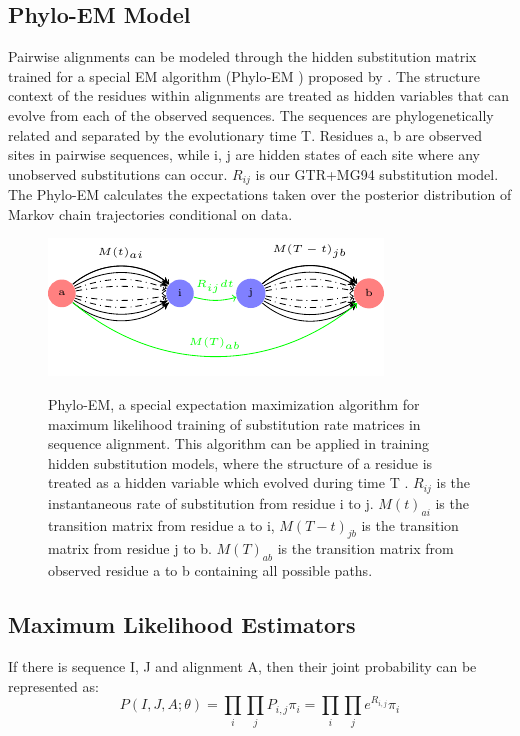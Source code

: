 \subsection{Phylo-EM Model}
Pairwise alignments can be modeled through the hidden substitution matrix trained for a special EM algorithm (Phylo-EM ) proposed by \cite{holmes2002expectation}. The structure context of the residues within alignments are treated as hidden variables that can evolve from each of the observed sequences. The sequences are phylogenetically related and separated by the evolutionary time T. Residues a, b are observed sites in pairwise sequences, while i, j are hidden states of each site where any unobserved substitutions can occur. $R_{ij}$ is our GTR+MG94 substitution model. The Phylo-EM calculates the expectations taken over the posterior distribution of Markov chain trajectories conditional on data. 
\begin{figure}[H]
     \centering
     \begin{minipage}[t]{1\textwidth}
     \includegraphics[width=\linewidth]{Fig1.pdf}
     {Phylo-EM, a special expectation maximization algorithm for maximum likelihood training of substitution rate matrices in sequence alignment. This algorithm can be applied in training hidden substitution models, where the structure of a residue is treated as a hidden variable which evolved during time T \parencite{holmes2002expectation}. $R_{ij}$ is the instantaneous rate of substitution from residue i to j. $M(t)_{ai}$ is the transition matrix from residue a to i, $M(T-t)_{jb}$ is the transition matrix from residue j to b. $M(T)_{ab}$ is the transition matrix from observed residue a to b containing all possible paths.\par}
     \end{minipage}
\end{figure}

\subsection{Maximum Likelihood Estimators}
If there is sequence I, J and alignment A, then their joint probability can be represented as: 
\begin{equation*} 
 P(I,J,A;\theta)  = \prod_{i}\prod_{j} P_{i,j} \pi_{i} = \prod_{i}\prod_{j} e^{R_{i,j}} \pi_{i} 
\end{equation*}

